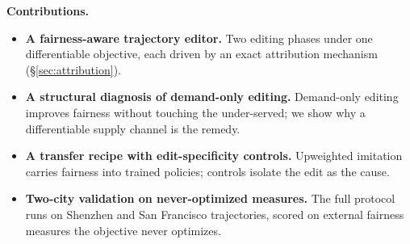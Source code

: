 \textbf{Contributions.}
\begin{itemize}
\item \textbf{A fairness-aware trajectory editor.} Two editing phases under
one differentiable objective, each driven by an exact attribution mechanism
(\S\ref{sec:attribution}).
\item \textbf{A structural diagnosis of de\-mand-only editing.} De\-mand-only
editing improves fairness without touching the under-served; we 
show why a differentiable supply channel is the remedy.
\item \textbf{A transfer recipe with edit-specificity controls.}
Upweighted imitation carries fairness into trained policies; controls
isolate the edit as the cause.
\item \textbf{Two-city validation on never-optimized measures.} The full 
protocol runs on Shenzhen and San Francisco trajectories, scored on external 
fairness measures the objective never optimizes.
\end{itemize}
